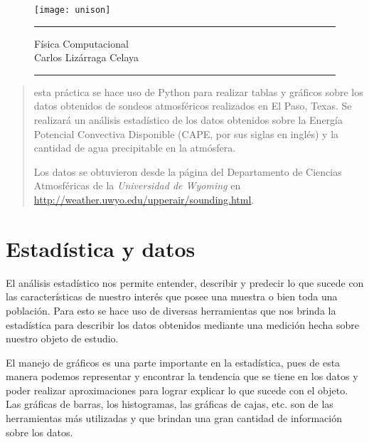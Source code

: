 


\begin{titlepage}%

\begin{figure}[h!]
    \centering
    \texttt{[image: unison]}
    \\[2 cm]
    \hrule
    \maketitle
    {\Large Física Computacional\\Carlos Lizárraga Celaya}
    \bigskip
    \hrule
    \thispagestyle{empty}
\end{figure}
 \begin{abstract}
   \noindent esta práctica se hace uso de Python para realizar tablas y gráficos sobre los datos obtenidos de sondeos atmosféricos realizados en El Paso, Texas. Se realizará un análisis estadístico de los datos obtenidos sobre la Energía Potencial Convectiva Disponible (CAPE, por sus siglas en inglés) y la cantidad de agua precipitable en la atmósfera.
   
   Los datos se obtuvieron desde la página del Departamento de Ciencias Atmosféricas de la \textit{Universidad de Wyoming} en \url{http://weather.uwyo.edu/upperair/sounding.html}.
    \end{abstract}
    \end{titlepage}
\newpage
\tableofcontents

\newpage
\section{Estadística y datos}
\noindent El análisis estadístico nos permite entender, describir y predecir lo que sucede con las características de nuestro interés que posee una muestra o bien toda una población. Para esto se hace uso de diversas herramientas que nos brinda la estadística para describir los datos obtenidos mediante una medición hecha sobre nuestro objeto de estudio.

El manejo de gráficos es una parte importante en la estadística, pues de esta manera podemos representar y encontrar la tendencia que se tiene en los datos y poder realizar aproximaciones para lograr explicar lo que sucede con el objeto. Las gráficas de barras, los histogramas, las gráficas de cajas, etc. son de las herramientas más utilizadas y que brindan una gran cantidad de información sobre los datos. \cite{devst}

